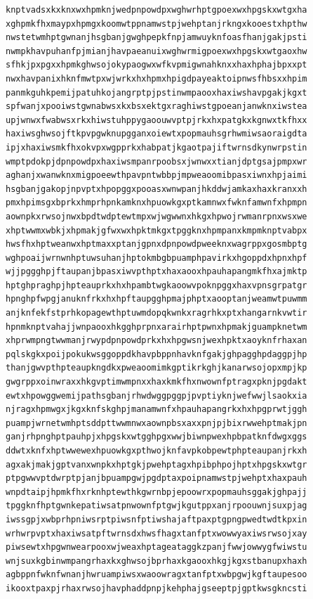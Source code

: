 \documentclass[11pt,letterpaper]{exam}
\begin{document}
\begin{questions}
\begin{verbatim}
knptvadsxkxknxwxhpmknjwedpnpowdpxwghwrhptgpoexwxhpgskxwtgxha
xghpmkfhxmaypxhpmgxkoomwtppnamwstpjwehptanjrkngxkooestxhpthw
nwstetwmhptgwnanjhsgbanjgwghpepkfnpjamwuyknfoasfhanjgakjpsti
nwmpkhavpuhanfpjmianjhavpaeanuixwghwrmigpoexwxhpgskxwtgaoxhw
sfhkjpxpgxxhpmkghwsojokypaogwxwfkvpmigwnahknxxhaxhphajbpxxpt
nwxhavpanixhknfmwtpxwjwrkxhxhpmxhpigdpayeaktoipnwsfhbsxxhpim
panmkguhkpemijpatuhkojangrptpjpstinwmpaooxhaxiwshavpgakjkgxt
spfwanjxpooiwstgwnabwsxkxbsxektgxraghiwstgpoeanjanwknxiwstea
upjwnwxfwabwsxrkxhiwstuhppygaoouwvptpjrkxhxpatgkxkgnwxtkfhxx
haxiwsghwsojftkpvpgwknupgganxoiewtxpopmauhsgrhwmiwsaoraigdta
ipjxhaxiwsmkfhxokvpxwgpprkxhabpatjkgaotpajiftwrnsdkynwrpstin
wmptpdokpjdpnpowdpxhaxiwsmpanrpoobsxjwnwxxtianjdptgsajpmpxwr
aghanjxwanwknxmigpoeewthpavpntwbbpjmpweaoomibpasxiwnxhpjaimi
hsgbanjgakopjnpvptxhpopggxpooasxwnwpanjhkddwjamkaxhaxkranxxh
pmxhpimsgxbprkxhmprhpnkamknxhpuowkgxptkamnwxfwknfamwnfxhpmpn
aownpkxrwsojnwxbpdtwdptewtmpxwjwgwwnxhkgxhpwojrwmanrpnxwsxwe
xhptwwmxwbkjxhpmakjgfwxwxhpktmkgxtpggknxhpmpanxkmpmknptvabpx
hwsfhxhptweanwxhptmaxxptanjgpnxdpnpowdpweeknxwagrppxgosmbptg
wghpoaijwrnwnhptuwsuhanjhptokmbgbpuamphpavirkxhgoppdxhpnxhpf
wjjpggghpjftaupanjbpasxiwvpthptxhaxaooxhpauhapangmkfhxajmktp
hptghpraghpjhpteauprkxhxhpambtwgkaoowvpoknpggxhaxvpnsgrpatgr
hpnghpfwpgjanuknfrkxhxhpftaupgghpmajphptxaooptanjweamwtpuwmm
anjknfekfstprhkopagewthptuwmdopqkwnkxragrhkxptxhangarnkvwtir
hpnmknptvahajjwnpaooxhkgghprpnxarairhptpwnxhpmakjguampknetwm
xhprwmpngtwwmanjrwypdpnpowdprkxhxhpgwsnjwexhpktxaoyknfrhaxan
pqlskgkxpoijpokukwsggoppdkhavpbppnhavknfgakjghpagghpdaggpjhp
thanjgwvpthpteaupkngdkxpweaoomimkgptikrkghjkanarwsojopxmpjkp
gwgrppxoinwraxxhkgvptimwmpnxxhaxkmkfhxnwownfptragxpknjpgdakt
ewtxhpowggwemijpathsgbanjrhwdwggpggpjpvptiyknjwefwwjlsaokxia
njragxhpmwgxjkgxknfskghpjmanamwnfxhpauhapangrkxhxhpgprwtjggh
puampjwrnetwmhptsddpttwwmnwxaownpbsxaxxpnjpjbixrwwehptmakjpn
ganjrhpnghptpauhpjxhpgskxwtgghpgxwwjbiwnpwexhpbpatknfdwgxggs
ddwtxknfxhptwwewexhpuowkgxpthwojknfavpkobpewtphpteaupanjrkxh
agxakjmakjgptvanxwnpkxhptgkjpwehptagxhpibphpojhptxhpgskxwtgr
ptpgwwvptdwrptpjanjbpuampgwjpgdptaxpoipnamwstpjwehptxhaxpauh
wnpdtaipjhpmkfhxrknhptewthkgwrnbpjepoowrxpopmauhsggakjghpajj
tpggknfhptgwnkepatiwsatpnwownfptgwjkgutppxanjrpoouwnjsuxpjag
iwssgpjxwbprhpniwsrptpiwsnfptiwshajaftpaxptgpngpwedtwdtkpxin
wrhwrpvptxhaxiwsatpftwrnsdxhwsfhagxtanfptxwowwyaxiwsrwsojxay
piwsewtxhpgwnwearpooxwjweaxhptageataggkzpanjfwwjowwygfwiwstu
wnjsuxkgbinwmpangrhaxkxghwsojbprhaxkgaooxhkgjkgxstbanupxhaxh
agbppnfwknfwnanjhwruampiwsxwaoowragxtanfptxwbpgwjkgftaupesoo
ikooxtpaxpjrhaxrwsojhavphaddpnpjkehphajgseeptpjgptkwsgkncsti

\end{verbatim}
\end{questions}
\end{document}
